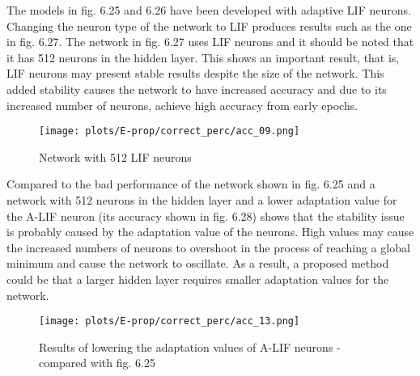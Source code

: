 \documentclass[12pt]{report}
\begin{document}
The models in fig. 6.25 and 6.26 have been developed with adaptive LIF neurons. Changing the neuron type of the network to LIF produces results such as the one in fig. 6.27. The network in fig. 6.27 uses LIF neurons and it should be noted that it has 512 neurons in the hidden layer. This shows an important result, that is, LIF neurons may present stable results despite the size of the network. This added stability causes the network to have increased accuracy and due to its increased number of neurons, achieve high accuracy from early epochs. 

\begin{figure}[htp] %
    \centering
     \texttt{[image: plots/E-prop/correct\_perc/acc\_09.png]}
    \caption{Network with 512 LIF neurons}
    \label{fig:representation-methods}
\end{figure}

Compared to the bad performance of the network shown in fig. 6.25 and a network with 512 neurons in the hidden layer and a lower adaptation value for the A-LIF neuron (its accuracy shown in fig. 6.28) shows that the stability issue is probably caused by the adaptation value of the neurons. High values may cause the increased numbers of neurons to overshoot in the process of reaching a global minimum and cause the network to oscillate. As a result, a proposed method could be that a larger hidden layer requires smaller adaptation values for the network.

\begin{figure}[htp] %
    \centering
     \texttt{[image: plots/E-prop/correct\_perc/acc\_13.png]}
    \caption{Results of lowering the adaptation values of A-LIF neurons - compared with fig. 6.25}
    \label{fig:representation-methods}
\end{figure}
\end{document}
